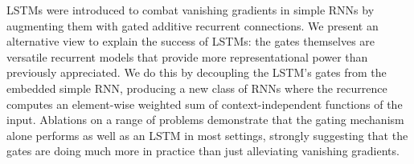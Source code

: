 LSTMs were introduced to combat vanishing gradients in simple RNNs by augmenting them with gated additive recurrent connections. We present an alternative view to explain the success of LSTMs: the gates themselves are versatile recurrent models that provide more representational power than previously appreciated. We do this by decoupling the LSTM's gates from the embedded simple RNN, producing a new class of RNNs where the recurrence computes an element-wise weighted sum of context-independent functions of the input. Ablations on a range of problems demonstrate that the gating mechanism alone performs as well as an LSTM in most settings, strongly suggesting that the gates are doing much more in practice than just alleviating vanishing gradients.

